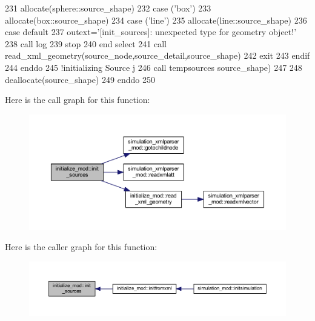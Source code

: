 \begin{DoxyCode}
231                     \textcolor{keyword}{allocate}(sphere::source\_shape)
232                 \textcolor{keywordflow}{case} (\textcolor{stringliteral}{'box'})
233                     \textcolor{keyword}{allocate}(box::source\_shape)
234                 \textcolor{keywordflow}{case} (\textcolor{stringliteral}{'line'})
235                     \textcolor{keyword}{allocate}(line::source\_shape)
236 \textcolor{keywordflow}{                    case default}
237                     outext=\textcolor{stringliteral}{'[init\_sources]: unexpected type for geometry object!'}
238                     \textcolor{keyword}{call }log%
239                     stop
240 \textcolor{keywordflow}{                end select}
241                 \textcolor{keyword}{call }read\_xml\_geometry(source\_node,source\_detail,source\_shape)
242                 \textcolor{keywordflow}{exit}
243 \textcolor{keywordflow}{            endif}
244 \textcolor{keywordflow}{        enddo}
245         \textcolor{comment}{!initializing Source j       }
246         \textcolor{keyword}{call }tempsources%
      source\_shape)
247 
248         \textcolor{keyword}{deallocate}(source\_shape)
249 \textcolor{keywordflow}{    enddo}
250 
\end{DoxyCode}
Here is the call graph for this function\+:\nopagebreak
\begin{figure}[H]
\begin{center}
\leavevmode
\includegraphics[width=350pt]{namespaceinitialize__mod_aae6a35bca190cdf65a6146f254264cd1_cgraph}
\end{center}
\end{figure}
Here is the caller graph for this function\+:\nopagebreak
\begin{figure}[H]
\begin{center}
\leavevmode
\includegraphics[width=350pt]{namespaceinitialize__mod_aae6a35bca190cdf65a6146f254264cd1_icgraph}
\end{center}
\end{figure}
\mbox{\label{namespaceinitialize__mod_a107012ffec69fe2d7c524d240193439e}} 
